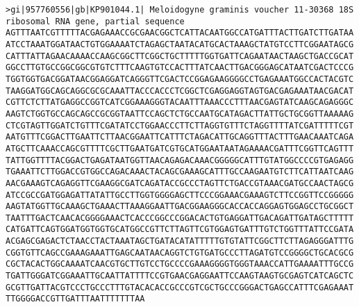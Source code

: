 \documentclass[11pt]{article}
\begin{document}
\begin{Verbatim}[commandchars=\\\{\}]
>gi|957760556|gb|KP901044.1| Meloidogyne graminis voucher 11-30368 18S ribosomal RNA gene, partial sequence
AGTTTAATCGTTTTTACGAGAAACCGCGAACGGCTCATTACAATGGCCATGATTTACTTGATCTTGATAA
ATCCTAAATGGATAACTGTGGAAAATCTAGAGCTAATACATGCACTAAAGCTATGTCCTTCGGAATAGCG
CATTTATTAGAACAAAACCAAGCGGCTTCGGCTGCTTTTTGGTGATTCAGAATAACTAAGCTGACCGCAT
GGCCTTGTGCCGGCGGCGTGTCTTTCAAGTGTCCACTTTATCAACTTGACGGGAGCATAATCGACTCCCG
TGGTGGTGACGGATAACGGAGGATCAGGGTTCGACTCCGGAGAAGGGGCCTGAGAAATGGCCACTACGTC
TAAGGATGGCAGCAGGCGCGCAAATTACCCACCCTCGGCTCGAGGAGGTAGTGACGAGAAATAACGACAT
CGTTCTCTTATGAGGCCGGTCATCGGAAAGGGTACAATTTAAACCCTTTAACGAGTATCAAGCAGAGGGC
AAGTCTGGTGCCAGCAGCCGCGGTAATTCCAGCTCTGCCAATGCATAGACTTATTGCTGCGGTTAAAAAG
CTCGTAGTTGGATCTGTTTCGATATCCTGGAACCCTTCTTAGGTGTTTCTAGGTTTTATCGATTTTTCGT
AATGTTTCGGACTTGAATTCTTAACGGAATTCATTTCTAGACATTGCAGGTTTACTTTGAACAAATCAGA
ATGCTTCAAACCAGCGTTTTCGCTTGAATGATCGTGCATGGAATAATAGAAAACGATTTCGGTTCAGTTT
TATTGGTTTTACGGACTGAGATAATGGTTAACAGAGACAAACGGGGGCATTTGTATGGCCCCGTGAGAGG
TGAAATTCTTGGACCGTGGCCAGACAAACTACAGCGAAAGCATTTGCCAAGAATGTCTTCATTAATCAAG
AACGAAAGTCAGAGGTTCGAAGGCGATCAGATACCGCCCTAGTTCTGACCGTAAACGATGCCAACTAGCG
ATCCGCCGATGGAGATTATATTGCCTTGGTGGGGAGCTTCCCGGAAACGAAAGTCTTCCGGTTCCGGGGG
AAGTATGGTTGCAAAGCTGAAACTTAAAGGAATTGACGGAAGGGCACCACCAGGAGTGGAGCCTGCGGCT
TAATTTGACTCAACACGGGGAAACTCACCCGGCCCGGACACTGTGAGGATTGACAGATTGATAGCTTTTT
CATGATTCAGTGGATGGTGGTGCATGGCCGTTCTTAGTTCGTGGAGTGATTTGTCTGGTTTATTCCGATA
ACGAGCGAGACTCTAACCTACTAAATAGCTGATACATATTTTTGTGTATTCGGCTTCTTAGAGGGATTTG
CGGTGTTCAGCCGAAAGAAATTGAGCAATAACAGGTCTGTGATGCCCTTAGATGTCCGGGGCTGCACGCG
CGCTACACTGGCAAAATCAACGTGCTTGTCCTGCCCCGAAAGGGGTGGGTAAACCATTGAAAATTTGCCG
TGATTGGGATCGGAAATTGCAATTATTTTCCGTGAACGAGGAATTCCAAGTAAGTGCGAGTCATCAGCTC
GCGTTGATTACGTCCCTGCCCTTTGTACACACCGCCCGTCGCTGCCCGGGACTGAGCCATTTCGAGAAAT
TTGGGGACCGTTGATTTAATTTTTTTAA


\end{Verbatim}
\end{document}
